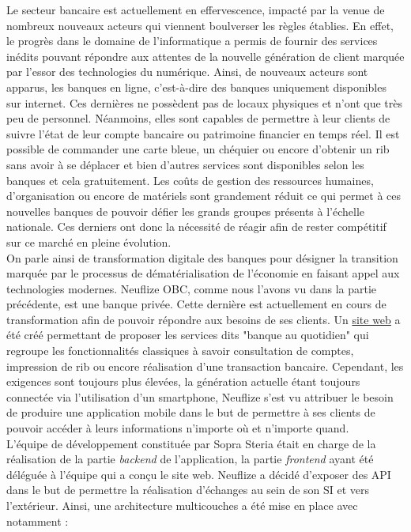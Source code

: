 	Le secteur bancaire est actuellement en effervescence, impacté par la venue de nombreux nouveaux acteurs qui viennent boulverser les règles établies. En effet, le progrès dans le domaine de l'informatique a permis de fournir des services inédits pouvant répondre aux attentes de la nouvelle génération de client marquée par l'essor des technologies du numérique. Ainsi, de nouveaux acteurs sont apparus, les banques en ligne, c'est-à-dire des banques uniquement disponibles sur internet. Ces dernières ne possèdent pas de locaux physiques et n'ont que très peu de personnel. Néanmoins, elles sont capables de permettre à leur clients de suivre l'état de leur compte bancaire ou patrimoine financier en temps réel. Il est possible de commander une carte bleue, un chéquier ou encore d'obtenir un rib sans avoir à se déplacer et bien d'autres services sont disponibles selon les banques et cela gratuitement. Les coûts de gestion des ressources humaines, d'organisation ou encore de matériels sont grandement réduit ce qui permet à ces nouvelles banques de pouvoir défier les grands groupes présents à l'échelle nationale. Ces derniers ont donc la nécessité de réagir afin de rester compétitif sur ce marché en pleine évolution. \\

	On parle ainsi de transformation digitale des banques pour désigner la transition marquée par le processus de dématérialisation de l'économie en faisant appel aux technologies modernes. Neuflize OBC, comme nous l'avons vu dans la partie précédente, est une banque privée. Cette dernière est actuellement en cours de transformation afin de pouvoir répondre aux besoins de ses clients. Un \href{https://www.neuflizeobc.net/portail/portail.jsp}{site web} a été créé permettant de proposer les services dits "banque au quotidien" qui regroupe les fonctionnalités classiques à savoir consultation de comptes, impression de rib ou encore réalisation d'une transaction bancaire. Cependant, les exigences sont toujours plus élevées, la génération actuelle étant toujours connectée via l'utilisation d'un smartphone, Neuflize s'est vu attribuer le besoin de produire une application mobile dans le but de permettre à ses clients de pouvoir accéder à leurs informations n'importe où et n'importe quand. \\

	L'équipe de développement constituée par Sopra Steria était en charge de la réalisation de la partie \textit{backend} de l'application, la partie \textit{frontend} ayant été déléguée à l'équipe qui a conçu le site web. Neuflize a décidé d'exposer des API dans le but de permettre la réalisation d'échanges au sein de son SI et vers l'extérieur. Ainsi, une architecture multicouches a été mise en place avec notamment :

